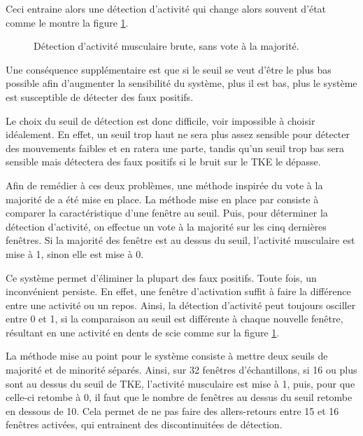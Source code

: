 \documentclass[letterpaper, twoside, 12pt, memoire, creativecommons, hyperref]{thETS}
\begin{document}
Ceci entraine alors une détection d'activité qui change alors souvent d'état comme le montre la figure \ref{fig:onsetSansVote}.

\begin{figure}
	\centering
	\caption{Détection d'activité musculaire brute, sans vote à la majorité.}
	\label{fig:onsetSansVote}
\end{figure}

Une conséquence supplémentaire est que si le seuil se veut d'être le plus bas possible afin d'augmenter la sensibilité du système, plus il est bas, plus le système est susceptible de détecter des faux positifs. 

Le choix du seuil de détection est donc difficile, voir impossible à choisir idéalement. En effet, un seuil trop haut ne sera plus assez sensible pour détecter des mouvements faibles et en ratera une parte, tandis qu'un seuil trop bas sera sensible mais détectera des faux positifs si le bruit sur le TKE le dépasse.

Afin de remédier à ces deux problèmes, une méthode inspirée du vote à la majorité de \cite{Chang1996} a été mise en place. La méthode mise en place par \cite{Chang1996} consiste à comparer la caractéristique d'une fenêtre au seuil. Puis, pour déterminer la détection d'activité, on effectue un vote à la majorité sur les cinq dernières fenêtres. Si la majorité des fenêtre est au dessus du seuil, l'activité musculaire est mise à 1, sinon elle est mise à 0.

Ce système permet d'éliminer la plupart des faux positifs. Toute fois, un inconvénient persiste. En effet, une fenêtre d'activation suffit à faire la différence entre une activité ou un repos. Ainsi, la détection d'activité peut toujours osciller entre 0 et 1, si la comparaison au seuil est différente à chaque nouvelle fenêtre, résultant en une activité en dents de scie comme sur la figure \ref{fig:onsetSansVote}.

La méthode mise au point pour le système consiste à mettre deux seuils de majorité et de minorité séparés. Ainsi, sur 32 fenêtres d'échantillons, si 16 ou plus sont au dessus du seuil de TKE, l'activité musculaire est mise à 1, puis, pour que celle-ci retombe à 0, il faut que le nombre de fenêtres au dessus du seuil retombe en dessous de 10. Cela permet de ne pas faire des allers-retours entre 15 et 16 fenêtres activées, qui entrainent des discontinuitées de détection.
\end{document}
